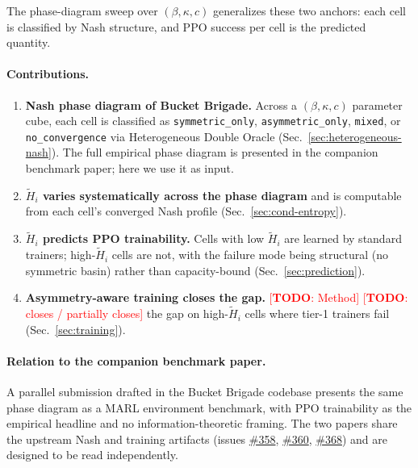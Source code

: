 \documentclass{article}
\newcommand{\TODO}[1]{\textcolor{red}{[\textbf{TODO}: #1]}}
\begin{document}
The phase-diagram sweep over $(\beta, \kappa, c)$ generalizes these two
anchors: each cell is classified by Nash structure, and PPO success per cell
is the predicted quantity.

\paragraph{Contributions.}
\begin{enumerate}
  \item \textbf{Nash phase diagram of Bucket Brigade.} Across a
    $(\beta, \kappa, c)$ parameter cube, each cell is classified as
    \texttt{symmetric\_only}, \texttt{asymmetric\_only}, \texttt{mixed}, or
    \texttt{no\_convergence} via Heterogeneous Double Oracle
    (Sec.~\ref{sec:heterogeneous-nash}).  The full empirical phase diagram is
    presented in the companion benchmark paper; here we use it as input.
  \item \textbf{$\tilde{H}_i$ varies systematically across the phase diagram}
    and is computable from each cell's converged Nash profile
    (Sec.~\ref{sec:cond-entropy}).
  \item \textbf{$\tilde{H}_i$ predicts PPO trainability.} Cells with low
    $\tilde{H}_i$ are learned by standard trainers; high-$\tilde{H}_i$ cells
    are not, with the failure mode being structural (no symmetric basin) rather
    than capacity-bound (Sec.~\ref{sec:prediction}).
  \item \textbf{Asymmetry-aware training closes the gap.} \TODO{Method}
    \TODO{closes / partially closes} the gap on high-$\tilde{H}_i$ cells where
    tier-1 trainers fail (Sec.~\ref{sec:training}).
\end{enumerate}

\paragraph{Relation to the companion benchmark paper.}
A parallel submission drafted in the Bucket Brigade codebase presents the same
phase diagram as a MARL environment benchmark, with PPO trainability as the
empirical headline and no information-theoretic framing.  The two papers share
the upstream Nash and training artifacts (issues
\href{https://github.com/rjwalters/bucket-brigade/issues/358}{\#358},
\href{https://github.com/rjwalters/bucket-brigade/issues/360}{\#360},
\href{https://github.com/rjwalters/bucket-brigade/issues/368}{\#368}) and are
designed to be read independently.

\end{document}
